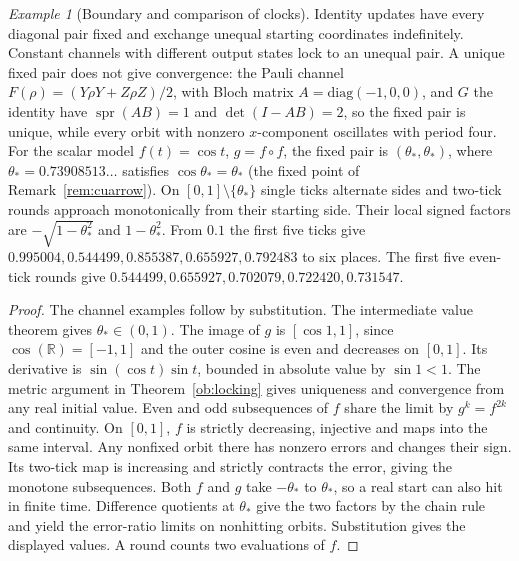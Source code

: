 \documentclass[aps,pra,onecolumn,superscriptaddress,nofootinbib,10pt]{revtex4-2}
\theoremstyle{definition}
\theoremstyle{remark}
\newtheorem{example}[theorem]{Example}
\newcommand{\R}{\mathbb{R}}
\begin{document}
\begin{example}[Boundary and comparison of clocks]\label{ob:cosine}
Identity updates have every diagonal pair fixed and exchange unequal
starting coordinates indefinitely. Constant channels with different
output states lock to an unequal pair.  A unique fixed pair does not give
convergence: the Pauli channel $F(\rho)=(Y\rho Y+Z\rho Z)/2$, with Bloch matrix
$A=\mathrm{diag}(-1,0,0)$, and $G$ the identity have $\operatorname{spr}(AB)=1$ and
$\det(I-AB)=2$, so the fixed pair is unique, while every orbit with nonzero $x$-component
oscillates with period four. For the scalar model
$f(t)=\cos t$, $g=f\circ f$, the fixed pair is $(\theta_*,\theta_*)$,
where $\theta_*=0.73908513\ldots$ satisfies $\cos\theta_*=\theta_*$ (the fixed point of Remark~\ref{rem:cuarrow}).
On $[0,1]\setminus\{\theta_*\}$ single ticks alternate sides and
two-tick rounds approach monotonically from their starting side.
Their local signed factors are $-\sqrt{1-\theta_*^2}$ and $1-\theta_*^2$.
From $0.1$ the first five ticks give
$0.995004,0.544499,0.855387,0.655927,0.792483$ to six places.
The first five even-tick rounds give
$0.544499,0.655927,0.702079,0.722420,0.731547$.
\end{example}
\begin{proof}
The channel examples follow by substitution. The intermediate value
theorem gives $\theta_*\in(0,1)$. The image of $g$ is $[\cos1,1]$,
since $\cos(\R)=[-1,1]$ and the outer cosine is even and decreases on
$[0,1]$. Its derivative is $\sin(\cos t)\sin t$, bounded in
absolute value by $\sin1<1$. The metric argument in
Theorem~\ref{ob:locking} gives uniqueness and convergence from any real
initial value. Even and odd subsequences of $f$ share the limit by
$g^k=f^{2k}$ and continuity. On $[0,1]$, $f$ is strictly decreasing,
injective and maps into the same interval. Any nonfixed orbit there
has nonzero errors and changes their sign. Its two-tick map is
increasing and strictly contracts the error, giving the monotone
subsequences. Both $f$ and $g$ take $-\theta_*$ to $\theta_*$, so a
real start can also hit in finite time. Difference quotients at
$\theta_*$ give the two factors by the chain rule and yield the
error-ratio limits on nonhitting orbits. Substitution gives the
displayed values. A round counts two evaluations of $f$.
\end{proof}
\end{document}
